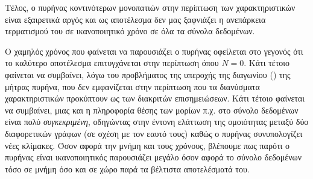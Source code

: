 Τέλος, ο πυρήνας κοντινότερων μονοπατιών στην περίπτωση των χαρακτηριστικών είναι εξαιρετικά αργός και ως αποτέλεσμα δεν μας ξαφνιάζει η ανεπάρκεια τερματισμού του σε ικανοποιητικό χρόνο σε όλα τα σύνολα δεδομένων.\par
Ο χαμηλός χρόνος που φαίνεται να παρουσιάζει ο πυρήνας  οφείλεται στο γεγονός ότι το καλύτερο αποτέλεσμα επιτυγχάνεται στην περίπτωση όπου $N=0$.
Κάτι τέτοιο φαίνεται να συμβαίνει, λόγω του προβλήματος της υπεροχής της διαγωνίου () της μήτρας πυρήνα, που δεν εμφανίζεται στην περίπτωση που τα διανύσματα χαρακτηριστικών προκύπτουν ως  των διακριτών επισημειώσεων.
Κάτι τέτοιο φαίνεται να συμβαίνει, μιας και η πληροφορία θέσης των μορίων π.χ. στο σύνολο δεδομένων  είναι πολύ \textit{συγκεκριμένη}, οδηγώντας στην έντονη ελάττωση της ομοιότητας μεταξύ δύο διαφορετικών γράφων (σε σχέση με τον εαυτό τους) καθώς ο πυρήνας συνυπολογίζει νέες κλίμακες.
Όσον αφορά την μνήμη και τους χρόνους, βλέπουμε πως παρότι ο πυρήνας  είναι ικανοποιητικός παρουσιάζει μεγάλο  όσον αφορά το σύνολο δεδομένων  τόσο σε μνήμη όσο και σε χώρο παρά τα βέλτιστα αποτελέσματά του.

